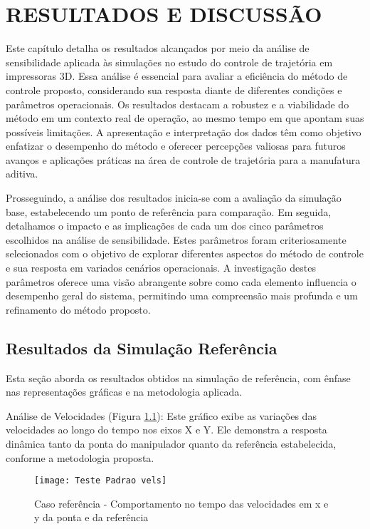 \chapter{RESULTADOS E DISCUSSÃO}
Este capítulo detalha os resultados alcançados por meio da análise de sensibilidade aplicada às simulações no estudo do controle de trajetória em impressoras 3D. Essa análise é essencial para avaliar a eficiência do método de controle proposto, considerando sua resposta diante de diferentes condições e parâmetros operacionais. Os resultados destacam a robustez e a viabilidade do método em um contexto real de operação, ao mesmo tempo em que apontam suas possíveis limitações. A apresentação e interpretação dos dados têm como objetivo enfatizar o desempenho do método e oferecer percepções valiosas para futuros avanços e aplicações práticas na área de controle de trajetória para a manufatura aditiva.

Prosseguindo, a análise dos resultados inicia-se com a avaliação da simulação base, estabelecendo um ponto de referência para comparação. Em seguida, detalhamos o impacto e as implicações de cada um dos cinco parâmetros escolhidos na análise de sensibilidade. Estes parâmetros foram criteriosamente selecionados com o objetivo de explorar diferentes aspectos do método de controle e sua resposta em variados cenários operacionais. A investigação destes parâmetros oferece uma visão abrangente sobre como cada elemento influencia o desempenho geral do sistema, permitindo uma compreensão mais profunda e um refinamento do método proposto.

\section{Resultados da Simulação Referência}
Esta seção aborda os resultados obtidos na simulação de referência, com ênfase nas representações gráficas e na metodologia aplicada.

Análise de Velocidades (Figura \ref{fig:t_padr_vels}): Este gráfico exibe as variações das velocidades ao longo do tempo nos eixos X e Y. Ele demonstra a resposta dinâmica tanto da ponta do manipulador quanto da referência estabelecida, conforme a metodologia proposta.

\begin{figure}[H]
    \begin{center}
    \caption{Caso referência - Comportamento no tempo das velocidades em x e y da ponta e da referência}
    \texttt{[image: Teste Padrao vels]}
    \label{fig:t_padr_vels}
    \end{center}
\end{figure}

